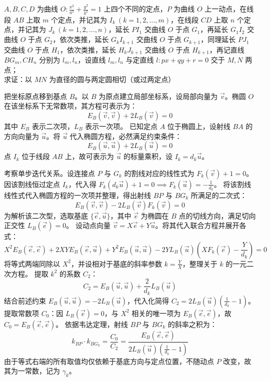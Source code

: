 \begin{exercise}
\(A,B,C,D\) 为曲线 \(O: \frac{x^2}{a^2} + \frac{y^2}{b^2} = 1\) 上四个不同的定点，\(P\) 为曲线 \(O\) 上一动点，在线段 \(AB\) 上取 \(m\) 个定点，并记其为 \(I_k\ (k=1,2,\dots,m)\)，在线段 \(CD\) 上取 \(n\) 个定点，并记其为 \(J_k\ (k=1,2,\dots,n)\)，延长 \(PI_1\) 交曲线 \(O\) 于点 \(G_1\)，再延长 \(G_1I_2\) 交曲线 \(O\) 于点 \(G_2\)，依次类推，延长 \(G_kI_{k+1}\) 交曲线 \(O\) 于点 \(G_{k+1}\)，同理延长 \(PJ_1\) 交曲线 \(O\) 于点 \(H_1\)，依次类推，延长 \(H_kJ_{k+1}\) 交曲线 \(O\) 于点 \(H_{k+1}\)，再记直线 \(BG_m, CH_n\) 分别为 \(l_m, l_n\)，设直线 \(l_m, l_n\) 与定直线 \(l: px + qy + r = 0\) 交于 \(M, N\) 两点；\\
求证：以 \(MN\) 为直径的圆与两定圆相切（或过两定点）
\end{exercise}
\begin{solution}
把坐标原点移到基点 $B$。以 $B$ 为原点建立局部坐标系，设局部向量为 $\vec{v}$。椭圆 $O$ 在该坐标系下无常数项，其方程可表示为：
$$ E_B(\vec{v}, \vec{v}) + 2L_B(\vec{v}) = 0 $$
其中 $E_B$ 表示二次项，$L_B$ 表示一次项。
已知定点 $A$ 位于椭圆上，设射线 $BA$ 的方向向量为 $\vec{u}$。将 $\vec{u}$ 代入椭圆方程，必然满足约束条件：
$$ E_B(\vec{u}, \vec{u}) + 2L_B(\vec{u}) = 0 $$
点 $I_k$ 位于线段 $AB$ 上，故可表示为 $\vec{u}$ 的标量乘积，设 $I_k = d_k \vec{u}$。

考察单步迭代关系。设连接点 $P$ 与 $G_k$ 的割线对应的线性式为 $F_k(\vec{v}) + 1 = 0$。因该割线恒过定点 $I_k$，代入得 $F_k(d_k \vec{u}) + 1 = 0 \implies F_k(\vec{u}) = -\frac{1}{d_k}$。
将该割线线性式代入椭圆方程的一次项并整理，得出射线 $BP$ 与 $BG_k$ 所满足的二次式：
$$ E_B(\vec{v}, \vec{v}) - 2L_B(\vec{v})F_k(\vec{v}) = 0 $$
为解析该二次型，选取基底 $\{\vec{e}, \vec{u}\}$，其中 $\vec{e}$ 为椭圆在 $B$ 点的切线方向，满足切向正交性 $L_B(\vec{e}) = 0$。
设动点向量 $\vec{v} = X \vec{e} + Y \vec{u}$。将其代入联合方程并展开各式：
$$ X^2 E_B(\vec{e},\vec{e}) + 2XY E_B(\vec{e},\vec{u}) + Y^2 E_B(\vec{u},\vec{u}) - 2Y L_B(\vec{u}) \left( X F_k(\vec{e}) - \frac{Y}{d_k} \right) = 0 $$
将等式两端同除以 $X^2$，并设相对于基底的斜率参数 $k = \frac{Y}{X}$，整理关于 $k$ 的一元二次方程。
提取 $k^2$ 的系数 $C_2$：
$$ C_2 = E_B(\vec{u},\vec{u}) + \frac{2}{d_k} L_B(\vec{u}) $$
结合前述约束 $E_B(\vec{u},\vec{u}) = -2L_B(\vec{u})$，代入化简得 $C_2 = 2L_B(\vec{u})\left( \frac{1}{d_k} - 1 \right)$。
提取常数项 $C_0$：因 $L_B(\vec{e}) = 0$，与 $X^2$ 相关的唯一项为 $E_B(\vec{e},\vec{e})$，故 $C_0 = E_B(\vec{e},\vec{e})$。
依据韦达定理，射线 $BP$ 与 $BG_k$ 的斜率之积为：
$$ k_{BP} \cdot k_{BG_k} = \frac{C_0}{C_2} = \frac{E_B(\vec{e},\vec{e})}{2L_B(\vec{u})\left( \frac{1}{d_k} - 1 \right)} $$
由于等式右端的所有取值均仅依赖于基底方向与定点位置，不随动点 $P$ 改变，故其为一常数，记为 $\gamma_k$。


\end{solution}
